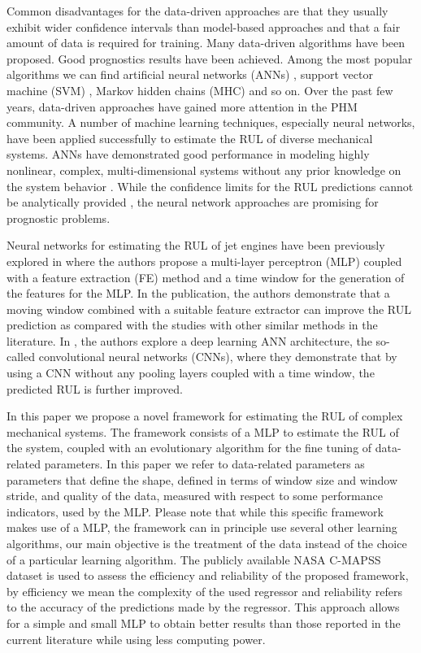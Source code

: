 \documentclass[preprint,12pt]{elsarticle}%
\begin{document}
Common disadvantages for the data-driven approaches are that they usually
exhibit wider confidence intervals than model-based approaches and that a fair
amount of data is required for training. Many data-driven algorithms have been
proposed. Good prognostics results have been achieved. Among the most popular
algorithms we can find artificial neural networks (ANNs) \cite{Gebraeel2004},
support vector machine (SVM) \cite{Benkedjouh2013}, Markov hidden chains (MHC)
\cite{Dong2007} and so on. Over the past few years, data-driven approaches
have gained more attention in the PHM community. A number of machine learning
techniques, especially neural networks, have been applied successfully to
estimate the RUL of diverse mechanical systems. ANNs have demonstrated good
performance in modeling highly nonlinear, complex, multi-dimensional systems
without any prior knowledge on the system behavior \cite{Li2018}. While the
confidence limits for the RUL predictions cannot be analytically provided
\cite{Sikorska2011}, the neural network approaches are promising for
prognostic problems.

Neural networks for estimating the RUL of jet engines have been previously
explored in \cite{Lim2016} where the authors propose a multi-layer perceptron
(MLP) coupled with a feature extraction (FE) method and a time window for the
generation of the features for the MLP. In the publication, the authors
demonstrate that a moving window combined with a suitable feature extractor
can improve the RUL prediction as compared with the studies with other similar
methods in the literature. In \cite{Li2018}, the authors explore a deep
learning ANN architecture, the so-called convolutional neural networks (CNNs),
where they demonstrate that by using a CNN without any pooling layers coupled
with a time window, the predicted RUL is further improved.

In this paper we propose a novel framework for estimating the RUL of complex
mechanical systems. The framework consists of a MLP to estimate the RUL of the
system, coupled with an evolutionary algorithm for the fine tuning of
data-related parameters. In this paper we refer to data-related parameters as parameters that define the shape, defined in terms of window size and window stride, and quality of the data, measured with respect to some performance indicators, used by the MLP. Please note that while this specific framework makes use of a MLP, 
the framework can in principle use several other learning algorithms, our main objective is the 
treatment of the data instead of the choice of a particular learning algorithm.
The publicly available NASA C-MAPSS dataset
\cite{CMAPS2008} is used to assess the efficiency and reliability of the
proposed framework, by efficiency we mean the complexity of the used regressor and reliability refers to the accuracy of the predictions made by the regressor. This approach allows for a simple and small MLP to obtain
better results than those reported in the current literature while using less
computing power.
\end{document}
